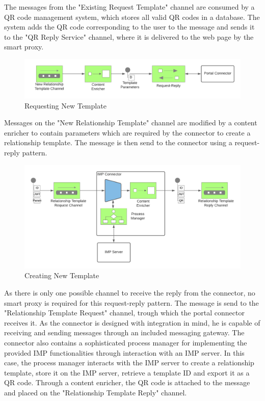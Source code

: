 \documentclass[
     12pt,         %
     a4paper,      %
     BCOR=10mm,version=first,     %
     DIV=14,version=first,        %
     ]{scrreprt}
\begin{document}
The messages from the "Existing Request Template" channel are consumed by a QR code management system, which stores all valid QR codes in a database. The system adds the QR code corresponding to the user to the message and sends it to the "QR Reply Service" channel, where it is delivered to the web page by the smart proxy.

\begin{figure}[h]
\caption{Requesting New Template}
    \centering
    \includegraphics[scale=0.3]{Diagrams/Integration 1/Connection/Messaging 5.png}
\end{figure}

Messages on the "New Relationship Template" channel are modified by a content enricher to contain parameters which are required by the connector to create a relationship template. The message is then send to the connector using a request-reply pattern.

\begin{figure}[h]
\caption{Creating New Template}
    \centering
    \includegraphics[scale=0.3]{Diagrams/Integration 1/Connection/Messaging 6.png}
\end{figure}

As there is only one possible channel to receive the reply from the connector, no smart proxy is required for this request-reply pattern. The message is send to the "Relationship Template Request" channel, trough which the portal connector receives it. As the connector is designed with integration in mind, he is capable of receiving and sending messages through an included messaging gateway. The connector also contains a sophisticated process manager for implementing the provided IMP functionalities through interaction with an IMP server. In this case, the process manager interacts with the IMP server to create a relationship template, store it on the IMP server, retrieve a template ID and export it as a QR code. Through a content enricher, the QR code is attached to the message and placed on the "Relationship Template Reply" channel.
\end{document}
